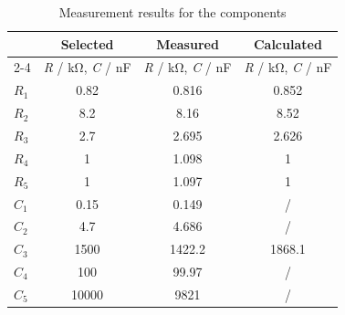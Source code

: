 \begin{table}[htbp]

  \centering
  \caption{Measurement results for the components}
    \begin{tabular}{|l|c|c|c|}
    \hline
    \rowcolor[rgb]{ .816,  .816,  .816}  & \textbf{Selected} & \textbf{Measured} & \textbf{Calculated} \bigstrut\\
    \cline{2-4}\rowcolor[rgb]{ .816,  .816,  .816}\multirow{-2}{*}{\textbf{Component}}&  \textit{R} / kΩ, \textit{C} / nF & \textit{R} / kΩ, \textit{C} / nF & \textit{R} / kΩ, \textit{C} / nF \bigstrut\\
    \hline
    \rowcolor[rgb]{ .816,  .816,  .816} $\textit{R}_1$    & \cellcolor[rgb]{ 1,  1,  1}0.82 & \cellcolor[rgb]{ 1,  1,  1}0.816 & \cellcolor[rgb]{ 1,  1,  1}0.852 \bigstrut\\
    \hline
    \rowcolor[rgb]{ .816,  .816,  .816} $\textit{R}_2$     & \cellcolor[rgb]{ 1,  1,  1}8.2 & \cellcolor[rgb]{ 1,  1,  1}8.16 & \cellcolor[rgb]{ 1,  1,  1}8.52 \bigstrut\\
    \hline
    \rowcolor[rgb]{ .816,  .816,  .816} $\textit{R}_3$     & \cellcolor[rgb]{ 1,  1,  1}2.7 & \cellcolor[rgb]{ 1,  1,  1}2.695 & \cellcolor[rgb]{ 1,  1,  1}2.626 \bigstrut\\
    \hline
    \rowcolor[rgb]{ .816,  .816,  .816} $\textit{R}_4$     & \cellcolor[rgb]{ 1,  1,  1}1 & \cellcolor[rgb]{ 1,  1,  1}1.098 & \cellcolor[rgb]{ 1,  1,  1}1 \bigstrut\\
    \hline
    \rowcolor[rgb]{ .816,  .816,  .816} $\textit{R}_5$     & \cellcolor[rgb]{ 1,  1,  1}1 & \cellcolor[rgb]{ 1,  1,  1}1.097 & \cellcolor[rgb]{ 1,  1,  1}1 \bigstrut\\
    \hline
    \rowcolor[rgb]{ .816,  .816,  .816} $\textit{C}_1$     & \cellcolor[rgb]{ 1,  1,  1}0.15 & \cellcolor[rgb]{ 1,  1,  1}0.149 & \cellcolor[rgb]{ 1,  1,  1}/ \bigstrut\\
    \hline
    \rowcolor[rgb]{ .816,  .816,  .816} $\textit{C}_2$    & \cellcolor[rgb]{ 1,  1,  1}4.7 & \cellcolor[rgb]{ 1,  1,  1}4.686 & \cellcolor[rgb]{ 1,  1,  1}/ \bigstrut\\
    \hline
    \rowcolor[rgb]{ .816,  .816,  .816} $\textit{C}_3$    & \cellcolor[rgb]{ 1,  1,  1}1500 & \cellcolor[rgb]{ 1,  1,  1}1422.2 & \cellcolor[rgb]{ 1,  1,  1}1868.1 \bigstrut\\
    \hline
    \rowcolor[rgb]{ .816,  .816,  .816} $\textit{C}_4$    & \cellcolor[rgb]{ 1,  1,  1}100 & \cellcolor[rgb]{ 1,  1,  1}99.97 & \cellcolor[rgb]{ 1,  1,  1}/ \bigstrut\\
    \hline
    \rowcolor[rgb]{ .816,  .816,  .816} $\textit{C}_5$    & \cellcolor[rgb]{ 1,  1,  1}10000 & \cellcolor[rgb]{ 1,  1,  1}9821 & \cellcolor[rgb]{ 1,  1,  1}/ \bigstrut\\
    \hline
    \end{tabular}%
  \label{tab:Bauteile2}%
\end{table}%
